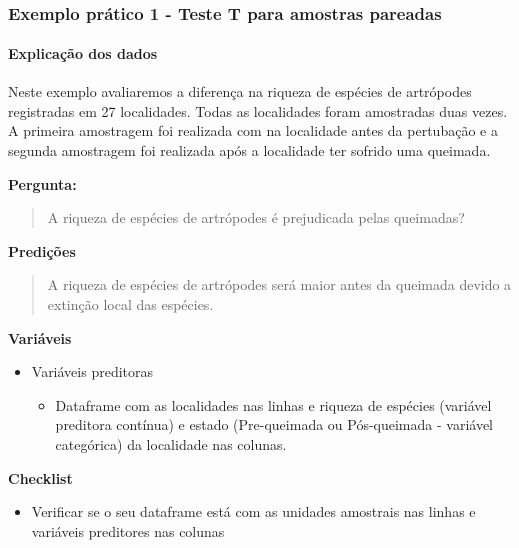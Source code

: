 \documentclass[
]{book}
\providecommand{\tightlist}{%
  \setlength{\itemsep}{0pt}\setlength{\parskip}{0pt}}
\begin{document}
~

\hypertarget{exemplo-pruxe1tico-1---teste-t-para-amostras-pareadas}{%
\subsubsection{Exemplo prático 1 - Teste T para amostras pareadas}\label{exemplo-pruxe1tico-1---teste-t-para-amostras-pareadas}}

\hypertarget{explicauxe7uxe3o-dos-dados-2}{%
\paragraph{Explicação dos dados}\label{explicauxe7uxe3o-dos-dados-2}}

Neste exemplo avaliaremos a diferença na riqueza de espécies de artrópodes registradas em 27 localidades. Todas as localidades foram amostradas duas vezes. A primeira amostragem foi realizada com na localidade antes da pertubação e a segunda amostragem foi realizada após a localidade ter sofrido uma queimada.

\textbf{Pergunta:}

\begin{quote}
A riqueza de espécies de artrópodes é prejudicada pelas queimadas?
\end{quote}

\textbf{Predições}

\begin{quote}
A riqueza de espécies de artrópodes será maior antes da queimada devido a extinção local das espécies.
\end{quote}

\textbf{Variáveis}

\begin{itemize}
\tightlist
\item
  Variáveis preditoras

  \begin{itemize}
  \tightlist
  \item
    Dataframe com as localidades nas linhas e riqueza de espécies (variável preditora contínua) e estado (Pre-queimada ou Pós-queimada - variável categórica) da localidade nas colunas.
  \end{itemize}
\end{itemize}

\textbf{Checklist}

\begin{itemize}
\tightlist
\item
  Verificar se o seu dataframe está com as unidades amostrais nas linhas e variáveis preditores nas colunas
\end{itemize}
\end{document}
